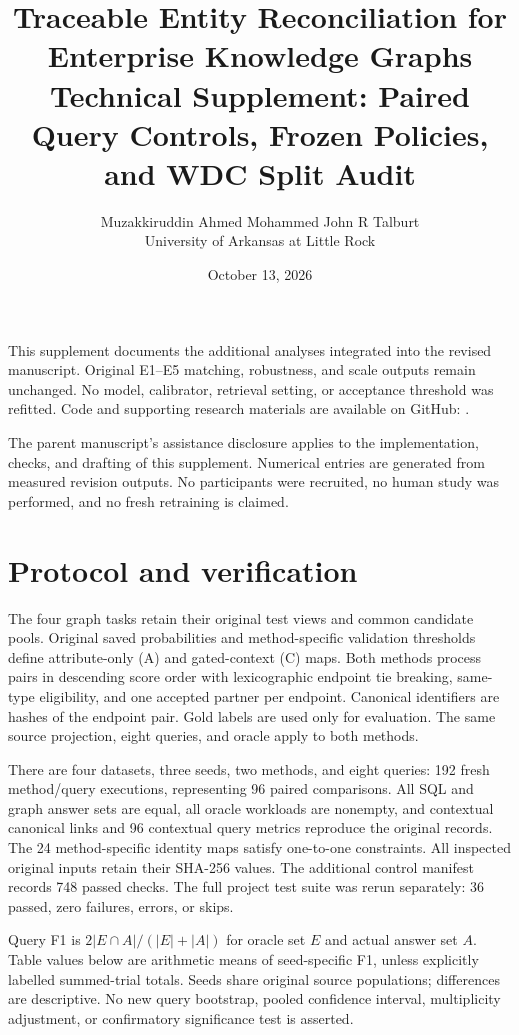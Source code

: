 \documentclass[11pt,letterpaper]{article}
\title{Traceable Entity Reconciliation for Enterprise Knowledge Graphs\\[6pt]\large Technical Supplement: Paired Query Controls, Frozen Policies, and WDC Split Audit}
\author{Muzakkiruddin Ahmed Mohammed \quad John R Talburt\\\small University of Arkansas at Little Rock}
\date{October 13, 2026}
\begin{document}
\maketitle
\noindent This supplement documents the additional analyses integrated into the revised manuscript. Original E1--E5 matching, robustness, and scale outputs remain unchanged. No model, calibrator, retrieval setting, or acceptance threshold was refitted. Code and supporting research materials are available on GitHub: \repositorylink.

\noindent The parent manuscript's assistance disclosure applies to the implementation, checks, and drafting of this supplement. Numerical entries are generated from measured revision outputs. No participants were recruited, no human study was performed, and no fresh retraining is claimed.

\section{Protocol and verification}
The four graph tasks retain their original test views and common candidate pools. Original saved probabilities and method-specific validation thresholds define attribute-only (A) and gated-context (C) maps. Both methods process pairs in descending score order with lexicographic endpoint tie breaking, same-type eligibility, and one accepted partner per endpoint. Canonical identifiers are hashes of the endpoint pair. Gold labels are used only for evaluation. The same source projection, eight queries, and oracle apply to both methods.

There are four datasets, three seeds, two methods, and eight queries: 192 fresh method/query executions, representing 96 paired comparisons. All SQL and graph answer sets are equal, all oracle workloads are nonempty, and contextual canonical links and 96 contextual query metrics reproduce the original records. The 24 method-specific identity maps satisfy one-to-one constraints. All inspected original inputs retain their SHA-256 values. The additional control manifest records 748 passed checks. The full project test suite was rerun separately: 36 passed, zero failures, errors, or skips.

Query F1 is $2|E\cap A|/(|E|+|A|)$ for oracle set $E$ and actual answer set $A$. Table values below are arithmetic means of seed-specific F1, unless explicitly labelled summed-trial totals. Seeds share original source populations; differences are descriptive. No new query bootstrap, pooled confidence interval, multiplicity adjustment, or confirmatory significance test is asserted.
\end{document}
